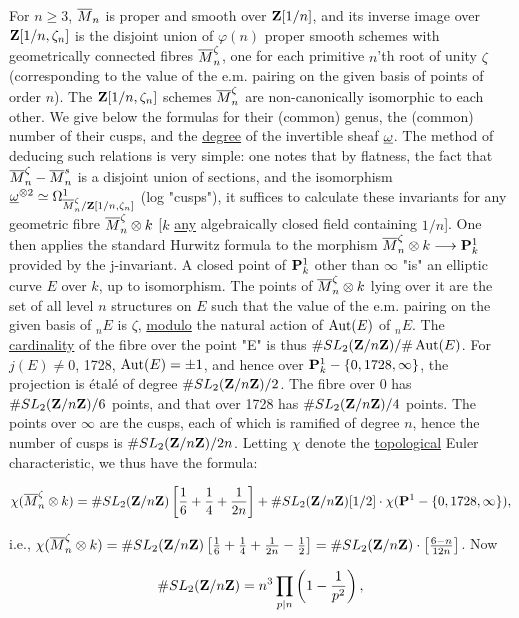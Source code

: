 
 For $n\geq 3$, $\overline{M}_n$ is proper and smooth over
$\mathbf{Z}[1/n]$, and its inverse image over $\mathbf{Z}[1/n,\zeta_n]$ is the disjoint union of
$\varphi(n)$ proper smooth schemes with geometrically connected fibres
$\overline{M}_n^\zeta$, one for each primitive $n$'th root of unity $\zeta$
(corresponding to the value of the e.m. pairing on the given basis of points of
order $n$). The $\mathbf{Z}[1/n,\zeta_n]$ schemes $\overline{M}_n^\zeta$ are non-canonically
isomorphic to each other. We give below the formulas for their (common) genus,
the (common) number of their cusps, and the \uline{degree} of the invertible
sheaf $\underline{\omega}$. The method of deducing such relations is very simple: one notes that
by flatness, the fact that $\overline{M}_n^\zeta-\overline{M}_n^s$ is a disjoint union of
sections, and the isomorphism
$\underline{\omega}^{\otimes 2}\simeq\Omega^1_{\overline{M}_n^\zeta/\mathbf{Z}[1/n,\zeta_n]}$ (log "cusps"), it
suffices to calculate these invariants for any geometric fibre
$\overline{M}_n^\zeta\otimes k$ [$k$ \uline{any} algebraically closed field containing
$1/n$]. One then applies the standard Hurwitz formula to the morphism
$\overline{M}_n^\zeta\otimes k\longrightarrow\mathbf{P}^1_k$ provided by the j-invariant. A
closed point of $\mathbf{P}^1_k$ other than $\infty$ "is" an elliptic curve $E$ over
$k$, up to isomorphism. The points of $\overline{M}_n^\zeta\otimes k$ lying over it are
the set of all level $n$ structures on $E$ such that the value of the e.m.
pairing on the given basis of ${}_nE$ is $\zeta$, \uline{modulo} the natural
action of $\operatorname{Aut}(E)$ of ${}_nE$. The \uline{cardinality} of the fibre over the
point "E" is thus $\#SL_2(\mathbf{Z}/n\mathbf{Z})/\#\operatorname{Aut}(E)$. For $j(E)\neq 0$, 1728,
$\operatorname{Aut}(E)=\pm 1$, and hence over $\mathbf{P}^1_k-\{0,1728,\infty\}$, the projection is
\'etal\'e of degree $\#SL_2(\mathbf{Z}/n\mathbf{Z})/2$. The fibre over 0 has
$\#SL_2(\mathbf{Z}/n\mathbf{Z})/6$ points, and that over 1728 has $\#SL_2(\mathbf{Z}/n\mathbf{Z})/4$ points. The
points over $\infty$ are the cusps, each of which is ramified of degree $n$,
hence the number of cusps is $\#SL_2(\mathbf{Z}/n\mathbf{Z})/2n$. Letting $\chi$ denote the
\uline{topological} Euler characteristic, we thus have the formula:

\[
\chi(\overline{M}_n^\zeta\otimes k) = \#SL_2(\mathbf{Z}/n\mathbf{Z})\left[\frac{1}{6}+\frac{1}{4}+\frac{1}{2n}\right]
+ \#SL_2(\mathbf{Z}/n\mathbf{Z})[1/2]\cdot\chi(\mathbf{P}^1-\{0,1728,\infty\}) ,
\]

i.e.,
$\chi(\overline{M}_n^\zeta\otimes k)=\#SL_2(\mathbf{Z}/n\mathbf{Z})\left[\frac{1}{6}+\frac{1}{4}+\frac{1}{2n}-\frac{1}{2}\right]
=\#SL_2(\mathbf{Z}/n\mathbf{Z})\cdot\left[\frac{6-n}{12n}\right]$. Now

\[
\#SL_2(\mathbf{Z}/n\mathbf{Z}) = n^3\prod_{p\mid n}\left(1-\frac{1}{p^2}\right) ,
\]

